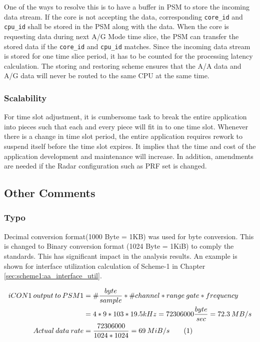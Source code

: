 One of the ways to resolve this is to have a buffer in PSM to store the incoming data stream. If the core is not accepting the data, corresponding \verb|core_id| and \verb|cpu_id| shall be stored in the PSM along with the data. When the core is requesting data during next A/G Mode time slice, the PSM can transfer the stored data if the \verb|core_id| and \verb|cpu_id| matches. Since the incoming data stream is stored for one time slice period, it has to be counted for the processing latency calculation. The storing and restoring scheme ensures that the A/A data and A/G data will never be routed to the same CPU at the same time.

\subsubsection{Scalability}
\label{sss:mm:cons:scalability}
For time slot adjustment, it is cumbersome task to break the entire application into pieces such that each and every piece will fit in to one time slot. Whenever there is a change in time slot period, the entire application requires rework to suspend itself before the time slot expires. It implies that the time and cost of the application development and maintenance will increase. In addition, amendments are needed if the Radar configuration such as PRF set is changed.


\subsection{Other Comments}
\subsubsection{Typo}
Decimal conversion format(1000 Byte = 1KB) was used for byte conversion. This is changed to Binary conversion format (1024 Byte = 1KiB) to comply the standards. This has significant impact in the analysis results. An example is shown for interface utilization calculation of Scheme-1 in Chapter \ref{sec:scheme1:aa_interface_util}.

\begin{align*}
	\label{equ:mm:typo}
	iCON1 \: output \: to \: PSM1 &= \#\frac{byte}{sample} * \#channel * range \: gate * frequency \\
	&= 4 * 9 * 103 * 19.5kHz = 72306000 \frac{byte}{sec} = 72.3 \: MB/s \\
	Actual \: data \: rate &= \frac{72306000}{1024 * 1024} = 69 \: MiB/s \stepcounter{equation}\tag{\theequation}
\end{align*}

